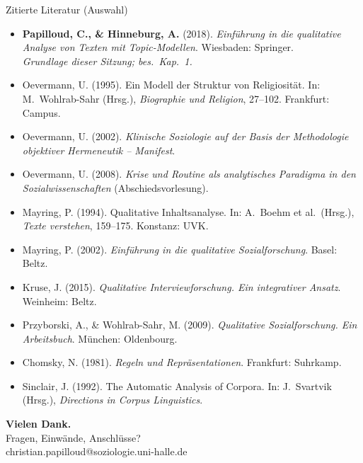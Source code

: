 \documentclass[aspectratio=169,11pt]{beamer}
\let\oldemph\emph
\renewcommand{\emph}[1]{{\color{solCyan}\oldemph{#1}}}
\let\oldtextbf\textbf
\renewcommand{\textbf}[1]{{\color{solBase3}\oldtextbf{#1}}}
\begin{document}
\begin{frame}[allowframebreaks]{Zitierte Literatur (Auswahl)}

  \footnotesize
  \begin{itemize}
    \item \textbf{Papilloud, C., \& Hinneburg, A.} (2018).
          \emph{Einführung in die qualitative Analyse von Texten mit
          Topic-Modellen}. Wiesbaden: Springer.
          \\\textit{Grundlage dieser Sitzung; bes.\ Kap.~1.}
    \item Oevermann, U. (1995). Ein Modell der Struktur von Religiosität.
          In: M.\ Wohlrab-Sahr (Hrsg.), \emph{Biographie und Religion},
          27–102. Frankfurt: Campus.
    \item Oevermann, U. (2002). \emph{Klinische Soziologie auf der Basis
          der Methodologie objektiver Hermeneutik – Manifest}.
    \item Oevermann, U. (2008). \emph{Krise und Routine als analytisches
          Paradigma in den Sozialwissenschaften} (Abschiedsvorlesung).
    \item Mayring, P. (1994). Qualitative Inhaltsanalyse. In: A.\ Boehm
          et al.\ (Hrsg.), \emph{Texte verstehen}, 159–175. Konstanz: UVK.
    \item Mayring, P. (2002). \emph{Einführung in die qualitative
          Sozialforschung}. Basel: Beltz.
    \item Kruse, J. (2015). \emph{Qualitative Interviewforschung. Ein
          integrativer Ansatz}. Weinheim: Beltz.
    \item Przyborski, A., \& Wohlrab-Sahr, M. (2009). \emph{Qualitative
          Sozialforschung. Ein Arbeitsbuch}. München: Oldenbourg.
    \item Chomsky, N. (1981). \emph{Regeln und Repräsentationen}.
          Frankfurt: Suhrkamp.
    \item Sinclair, J. (1992). The Automatic Analysis of Corpora.
          In: J.\ Svartvik (Hrsg.), \emph{Directions in Corpus Linguistics}.
  \end{itemize}

\end{frame}

\begin{frame}[plain]
  \begin{center}
    \vspace*{2em}
    {\Large\bfseries Vielen Dank.}
    \\[2em]
    Fragen, Einwände, Anschlüsse?
    \\[3em]
    \footnotesize\color{black!60}
    christian.papilloud@soziologie.uni-halle.de
  \end{center}
\end{frame}
\end{document}
